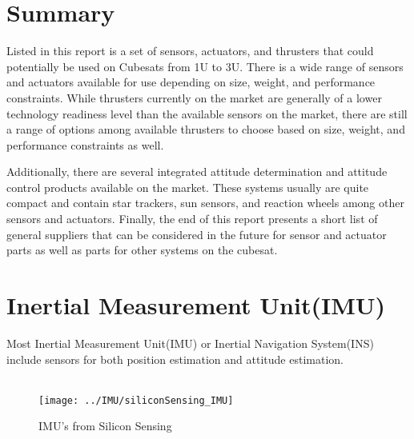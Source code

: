%
%
%
%
%

\section{Summary}
Listed in this report is a set of sensors, actuators, and thrusters that could potentially be used on Cubesats from 1U to 3U. There is a wide range of sensors and actuators available for use depending on size, weight, and performance constraints. While thrusters currently on the market are generally of a lower technology readiness level than the available sensors on the market, there are still a range of options among available thrusters to choose based on size, weight, and performance constraints as well. 

Additionally, there are several integrated attitude determination and attitude control products available on the market. These systems usually are quite compact and contain star trackers, sun sensors, and reaction wheels among other sensors and actuators. Finally, the end of this report presents a short list of general suppliers that can be considered in the future for sensor and actuator parts as well as parts for other systems on the cubesat. 

\section{Inertial Measurement Unit(IMU)}

Most Inertial Measurement Unit(IMU) or Inertial Navigation System(INS) include sensors for both position estimation and attitude estimation. \\\\


\begin{figure}[h!]
   \texttt{[image: ../IMU/siliconSensing\_IMU]}
   \caption{IMU's from Silicon Sensing \cite{imu1}}
\end{figure}



